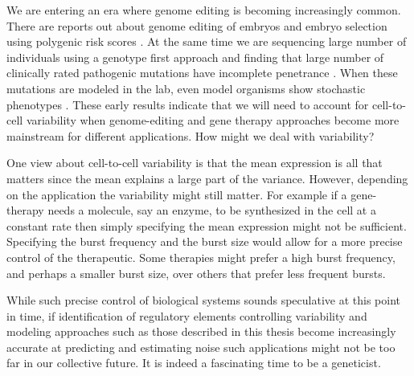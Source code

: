 We are entering an era where genome editing is becoming increasingly common. There are reports out about genome editing of embryos and embryo selection using polygenic risk scores \cite{ma2017n} \cite{pereira2022hr}. At the same time we are sequencing large number of individuals using a genotype first approach and finding that large number of clinically rated pathogenic mutations have incomplete penetrance \cite{forrest2022j}. When these mutations are modeled in the lab, even model organisms show stochastic phenotypes \cite{marmion2023cb}. These early results indicate that we will need to account for cell-to-cell variability when genome-editing and gene therapy approaches become more mainstream for different applications. How might we deal with variability?

One view about cell-to-cell variability is that the mean expression is all that matters since the mean explains a large part of the variance. However, depending on the application the variability might still matter. For example if a gene-therapy needs a molecule, say an enzyme, to be synthesized in the cell at a constant rate then simply specifying the mean expression might not be sufficient. Specifying the burst frequency and the burst size would allow for a more precise control of the therapeutic. Some therapies might prefer a high burst frequency, and perhaps a smaller burst size, over others that prefer less frequent bursts.

While such precise control of biological systems sounds speculative at this point in time, if identification of regulatory elements controlling variability \cite{zhao2023ng} and modeling approaches such as those described in this thesis become increasingly accurate at predicting and estimating noise such applications might not be too far in our collective future. It is indeed a fascinating time to be a geneticist.

